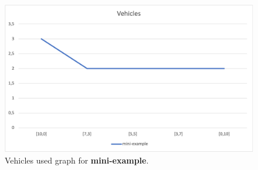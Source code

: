 \begin{figure}[H]
    \centering
    \includegraphics[height=0.25\textheight]{../graphs/mini-example-vehicles.png}
    \caption{Vehicles used graph for \textbf{mini-example}.}
\end{figure}

\newpage